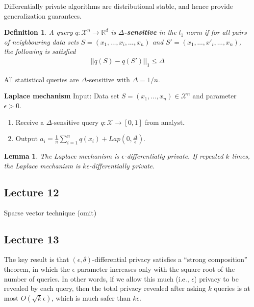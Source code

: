 \documentclass[]{article}
\newtheorem{lemma}{Lemma}[section]
\newtheorem{definition}{Definition}[section] %
\begin{document}
Differentially private algorithms are distributional stable, and hence provide generalization guarantees. 

\begin{definition}
	A query $q:\mathcal{X}^n \rightarrow \mathbb{R}^d$ is \textbf{$\Delta$-sensitive} in the $l_1$ norm if for all pairs of neighbouring data sets $S = (x_1, \dots, x_i, \dots, x_n)$ and $S' = (x_1, \dots, x'_i, \dots, x_n)$, the following is satisfied 
	\begin{align*}
		||q(S) - q(S')||_1 \le \Delta
	\end{align*}
\end{definition}
All statistical queries are $\Delta$-sensitive with $\Delta=1/n$.

\textbf{Laplace mechanism}
Input: Data set $S = (x_1, \dots, x_n) \in \mathcal{X}^n$ and parameter $\epsilon>0$. 
\begin{enumerate}
	\item Receive a $\Delta$-sensitive query $q:\mathcal{X} \rightarrow [0,1]$ from analyst.
	\item Output $a_i = \frac{1}{n} \sum_{i=1}^{n} q(x_i) + Lap(0, \frac{\Delta}{\epsilon})$.
\end{enumerate}

\begin{lemma}
	The Laplace mechanism is $\epsilon$-differentially private. If repeated $k$ times, the Laplace mechanism is $k\epsilon$-differentially private. 
\end{lemma}

\iffalse
\begin{lemma}
	The Gaussian mechanism is $(\epsilon,\delta)$-differentially private when $\sigma \ge \frac{2\Delta\sqrt{\ln 1/\delta}}{\epsilon}$, where $\Delta$ is the sensitivity of the query w.r.t. the $l_2$ norm. 
\end{lemma}
\fi 

\subsection{Lecture 12}
Sparse vector technique (omit)

\subsection{Lecture 13}
The key result is that $(\epsilon,\delta)$-differential privacy satisfies a ``strong composition'' theorem, in which the $\epsilon$ parameter increases only with the square root of the number of queries. In other words, if we allow this much (i.e., $\epsilon$) privacy to be revealed by each query, then the total privacy revealed after asking $k$ queries is at most $O(\sqrt{k} \epsilon)$, which is much safer than $k\epsilon$.
\end{document}
